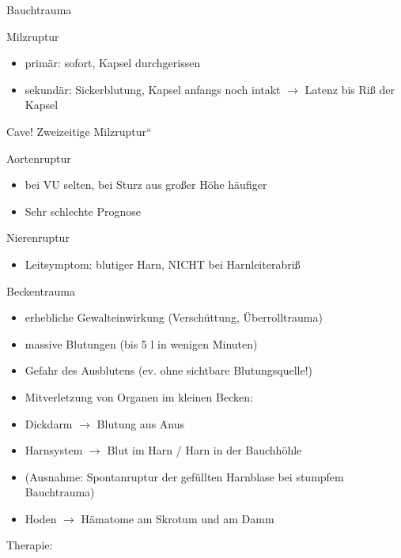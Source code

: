 \documentclass{article}
\begin{document}
Bauchtrauma

Milzruptur

\begin{itemize}
\item prim\"ar: sofort, Kapsel durchgerissen

\item sekund\"ar: Sickerblutung, Kapsel anfangs noch intakt
${\rightarrow}$ Latenz bis Ri{\ss} der Kapsel

\end{itemize}
Cave! {\quotedblbase}Zweizeitige
Milzruptur{\textquotedblleft}

Aortenruptur

\begin{itemize}
\item bei VU selten, bei Sturz aus gro{\ss}er H\"ohe  h\"aufiger

\item Sehr schlechte Prognose

\end{itemize}
Nierenruptur

\begin{itemize}
\item Leitsymptom: blutiger Harn, NICHT bei  Harnleiterabri{\ss}

\end{itemize}
Beckentrauma

\begin{itemize}
\item erhebliche Gewalteinwirkung  (Versch\"uttung, \"Uberrolltrauma)

\item massive  Blutungen (bis 5 l in wenigen  Minuten)

\item Gefahr des Ausblutens (ev. ohne sichtbare  Blutungsquelle!)

\item Mitverletzung von Organen im kleinen  Becken:

\end{itemize}
\begin{itemize}
\item Dickdarm ${\rightarrow}$ Blutung aus Anus

\item Harnsystem ${\rightarrow}$ Blut im Harn / Harn in der 
Bauchh\"ohle

\item (Ausnahme: Spontanruptur der gef\"ullten  Harnblase bei stumpfem
Bauchtrauma)

\item Hoden ${\rightarrow}$ H\"amatome am Skrotum und am  Damm

\end{itemize}
Therapie:
\end{document}
